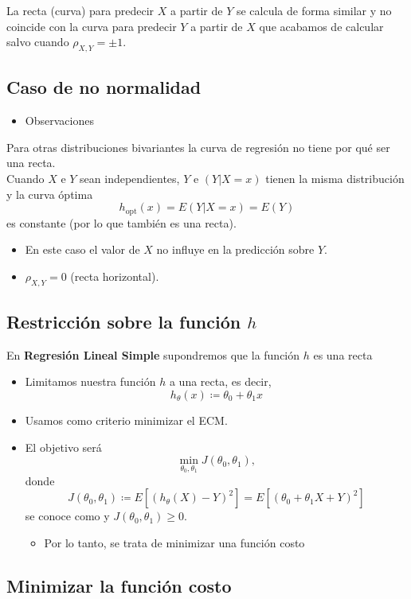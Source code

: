 La recta (curva) para predecir $X$ a partir de $Y$ se calcula de forma similar y no coincide con la curva para predecir $Y$ a partir de $X$ que acabamos de calcular salvo cuando $\rho_{X,Y}=\pm1$.
\subsection{Caso de no normalidad}
\begin{itemize}[label=\color{red}\textbullet, leftmargin=*]
	\item \color{lightblue}Observaciones
\end{itemize}
Para otras distribuciones bivariantes la curva de regresión no tiene por qué ser una recta.\\
Cuando $X$ e $Y$ sean independientes, $Y$ e $(Y|X=x)$ tienen la misma distribución y la curva óptima \[ h_{\mathrm{opt}}(x)=E(Y|X=x)=E(Y) \] es constante (por lo que también es una recta).
\begin{itemize}[label=\color{lightblue}$\to$]
\item En este caso el valor de $X$ no influye en la predicción sobre $Y$.
\item $\rho_{X,Y}=0$ (recta horizontal).
\end{itemize}
\subsection{Restricción sobre la función $h$}
En \textbf{Regresión Lineal Simple} supondremos que la función $h$ es una recta
\begin{itemize}
\item Limitamos nuestra función $h$ a una recta, es decir, \[ h_\theta(x)\coloneq\theta_0+\theta_1x \]
\item Usamos como criterio minimizar el ECM.
\item El objetivo será \[ \min_{\theta_0,\theta_1}J(\theta_0,\theta_1), \] donde \[ J(\theta_0,\theta_1)\coloneq E[(h_\theta(X)-Y)^2]=E[(\theta_0+\theta_1X+Y)^2] \]se conoce como  y $J(\theta_0,\theta_1)\ge0$.
\begin{itemize}[label=\color{lightblue}$\to$]
\item Por lo tanto, se trata de minimizar una función costo
\end{itemize}
\end{itemize}
\subsection{Minimizar la función costo}
